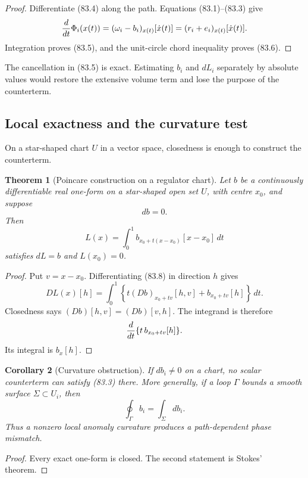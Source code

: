 \documentclass[11pt]{article}
\newtheorem{theorem}{Theorem}[section]
\newtheorem{corollary}[theorem]{Corollary}
\begin{document}
\begin{proof}
Differentiate (83.4) along the path.  Equations (83.1)--(83.3) give
\[
 {d\over dt}\Phi_i(x(t))
 =(\omega_i-b_i)_{x(t)}[\dot x(t)]
 =(r_i+e_i)_{x(t)}[\dot x(t)].
\]
Integration proves (83.5), and the unit-circle chord inequality proves
(83.6).
\end{proof}

The cancellation in (83.5) is exact.  Estimating \(b_i\) and
\(dL_i\) separately by absolute values would restore the extensive
volume term and lose the purpose of the counterterm.

\subsection{Local exactness and the curvature test}

On a star-shaped chart \(U\) in a vector space, closedness is enough
to construct the counterterm.

\begin{theorem}[Poincare construction on a regulator chart]
\label{thm:v11v83-poincare}
Let \(b\) be a continuously differentiable real one-form on a
star-shaped open set \(U\), with centre \(x_0\), and suppose
\[
                                      db=0.                  \tag{83.7}
\]
Then
\[
 L(x)=\int_0^1
 b_{x_0+t(x-x_0)}[x-x_0]\,dt                                \tag{83.8}
\]
satisfies \(dL=b\) and \(L(x_0)=0\).
\end{theorem}

\begin{proof}
Put \(v=x-x_0\).  Differentiating (83.8) in direction \(h\) gives
\[
 DL(x)[h]
 =\int_0^1\left\{
 t(Db)_{x_0+tv}[h,v]+b_{x_0+tv}[h]\right\}\,dt.
\]
Closedness says
\((Db)[h,v]=(Db)[v,h]\).  The integrand is therefore
\[
 {d\over dt}\{t\,b_{x_0+tv}[h]\}.
\]
Its integral is \(b_x[h]\).
\end{proof}

\begin{corollary}[Curvature obstruction]
\label{cor:v11v83-curvature}
If \(db_i\ne0\) on a chart, no scalar counterterm can satisfy
(83.3) there.  More generally, if a loop \(\Gamma\) bounds a smooth
surface \(\Sigma\subset U_i\), then
\[
                              \oint_\Gamma b_i
                              =\int_\Sigma db_i.             \tag{83.9}
\]
Thus a nonzero local anomaly curvature produces a path-dependent
phase mismatch.
\end{corollary}

\begin{proof}
Every exact one-form is closed.  The second statement is Stokes'
theorem.
\end{proof}
\end{document}
